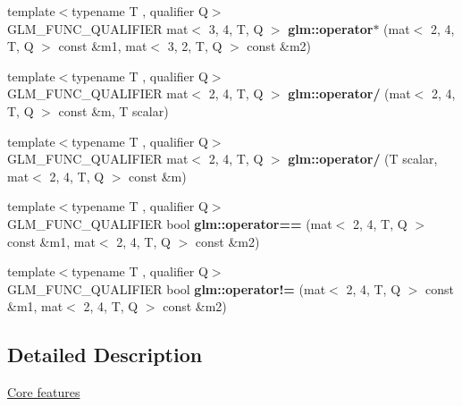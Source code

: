 \begin{DoxyCompactItemize}
\item 
\mbox{\label{type__mat2x4_8inl_a753c76b5c7f1ae965555dc2c5d139d84}} 
{\footnotesize template$<$typename T , qualifier Q$>$ }\\G\+L\+M\+\_\+\+F\+U\+N\+C\+\_\+\+Q\+U\+A\+L\+I\+F\+I\+ER mat$<$ 3, 4, T, Q $>$ {\bfseries glm\+::operator$\ast$} (mat$<$ 2, 4, T, Q $>$ const \&m1, mat$<$ 3, 2, T, Q $>$ const \&m2)
\item 
\mbox{\label{type__mat2x4_8inl_adc2792bd81fcfd191392ecb3e8dcc341}} 
{\footnotesize template$<$typename T , qualifier Q$>$ }\\G\+L\+M\+\_\+\+F\+U\+N\+C\+\_\+\+Q\+U\+A\+L\+I\+F\+I\+ER mat$<$ 2, 4, T, Q $>$ {\bfseries glm\+::operator/} (mat$<$ 2, 4, T, Q $>$ const \&m, T scalar)
\item 
\mbox{\label{type__mat2x4_8inl_a2e7504704478d55247109c81ab15637e}} 
{\footnotesize template$<$typename T , qualifier Q$>$ }\\G\+L\+M\+\_\+\+F\+U\+N\+C\+\_\+\+Q\+U\+A\+L\+I\+F\+I\+ER mat$<$ 2, 4, T, Q $>$ {\bfseries glm\+::operator/} (T scalar, mat$<$ 2, 4, T, Q $>$ const \&m)
\item 
\mbox{\label{type__mat2x4_8inl_a077c70500d52ecc999ef9e2d9def707a}} 
{\footnotesize template$<$typename T , qualifier Q$>$ }\\G\+L\+M\+\_\+\+F\+U\+N\+C\+\_\+\+Q\+U\+A\+L\+I\+F\+I\+ER bool {\bfseries glm\+::operator==} (mat$<$ 2, 4, T, Q $>$ const \&m1, mat$<$ 2, 4, T, Q $>$ const \&m2)
\item 
\mbox{\label{type__mat2x4_8inl_a25976bb0e275bab7879801f5d8debf7e}} 
{\footnotesize template$<$typename T , qualifier Q$>$ }\\G\+L\+M\+\_\+\+F\+U\+N\+C\+\_\+\+Q\+U\+A\+L\+I\+F\+I\+ER bool {\bfseries glm\+::operator!=} (mat$<$ 2, 4, T, Q $>$ const \&m1, mat$<$ 2, 4, T, Q $>$ const \&m2)
\end{DoxyCompactItemize}


\subsection{Detailed Description}
\hyperlink{group__core}{Core features} 
